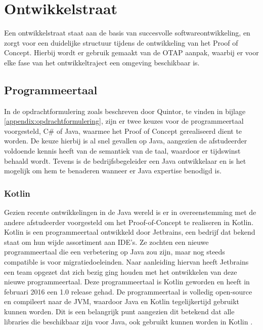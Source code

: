 \section{Ontwikkelstraat}

Een ontwikkelstraat staat aan de basis van succesvolle softwareontwikkeling, en zorgt voor een duidelijke structuur tijdens de ontwikkeling van het Proof of Concept. Hierbij wordt er gebruik gemaakt van de \gls{OTAP} aanpak, waarbij er voor elke fase van het ontwikkeltraject een omgeving beschikbaar is. 

\subsection{Programmeertaal}

In de opdrachtformulering zoals beschreven door Quintor, te vinden in bijlage \ref{appendix:opdrachtformulering}, zijn er twee keuzes voor de programmeertaal voorgesteld, C\# of Java, waarmee het Proof of Concept gerealiseerd dient te worden. De keuze hierbij is al snel gevallen op Java, aangezien de afstudeerder voldoende kennis heeft van de semantiek van de taal, waardoor er tijdswinst behaald wordt. Tevens is de bedrijfsbegeleider een Java ontwikkelaar en is het mogelijk om hem te benaderen wanneer er Java expertise benodigd is.

\subsubsection{Kotlin}

Gezien recente ontwikkelingen in de Java wereld is er in overeenstemming met de andere afstudeerder voorgesteld om het Proof-of-Concept te realiseren in Kotlin. Kotlin is een programmeertaal ontwikkeld door Jetbrains, een bedrijf dat bekend staat om hun wijde assortiment aan \acrfull{IDE}'s. Ze zochten een nieuwe programmeertaal die een verbetering op Java zou zijn, maar nog steeds compatible is voor migratiedoeleinden. Naar aanleiding hiervan heeft Jetbrains een team opgezet dat zich bezig ging houden met het ontwikkelen van deze nieuwe programmeertaal. Deze programmeertaal is Kotlin geworden en heeft in februari 2016 een 1.0 release gehad. De programmeertaal is volledig open-source en compileert naar de \acrfull{JVM}, waardoor Java en Kotlin tegelijkertijd gebruikt kunnen worden. Dit is een belangrijk punt aangezien dit betekend dat alle libraries die beschikbaar zijn voor Java, ook gebruikt kunnen worden in Kotlin \citep{mediaan_kotlin}.

